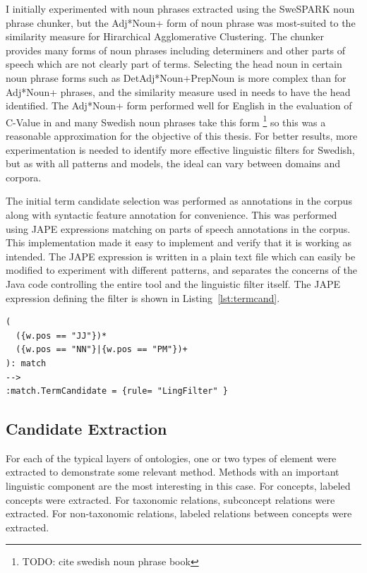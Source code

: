 \documentclass[a4paper]{report}
\newcommand{\todo}[1]{\footnote{{\color{red} TODO: #1}}}
\begin{document}
I initially experimented with noun phrases extracted using the SweSPARK noun phrase chunker, but the Adj*Noun+ form of noun phrase was most-suited to the similarity measure for Hirarchical Agglomerative Clustering.
The chunker provides many forms of noun phrases including determiners and other parts of speech which are not clearly part of terms.
Selecting the head noun in certain noun phrase forms such as DetAdj*Noun+PrepNoun is more complex than for Adj*Noun+ phrases, and the similarity measure used in \cite{Drymonas10OntoGain} needs to have the head identified.
The Adj*Noun+ form performed well for English in the evaluation of C-Value in \cite{Frantzi98CNCValue} and many Swedish noun phrases take this form \todo{cite swedish noun phrase book} so this was a reasonable approximation for the objective of this thesis.
For better results, more experimentation is needed to identify more effective linguistic filters for Swedish, but as with all patterns and models, the ideal can vary between domains and corpora.

The initial term candidate selection was performed as annotations in the corpus along with syntactic feature annotation for convenience.
This was performed using JAPE expressions matching on parts of speech annotations in the corpus.
This implementation made it easy to implement and verify that it is working as intended.
The JAPE expression is written in a plain text file which can easily be modified to experiment with different patterns, and separates the concerns of the Java code controlling the entire tool and the linguistic filter itself.
The JAPE expression defining the filter is shown in Listing~\ref{lst:termcand}.

\begin{Code}
\begin{lstlisting}[frame=single]
(
  ({w.pos == "JJ"})*
  ({w.pos == "NN"}|{w.pos == "PM"})+
): match
-->
:match.TermCandidate = {rule= "LingFilter" }
\end{lstlisting}
\end{Code}

\subsection{Candidate Extraction}

For each of the typical layers of ontologies, one or two types of element were extracted to demonstrate some relevant method.
Methods with an important linguistic component are the most interesting in this case. 
For concepts, labeled concepts were extracted.
For taxonomic relations, subconcept relations were extracted.
For non-taxonomic relations, labeled relations between concepts were extracted.
\end{document}
